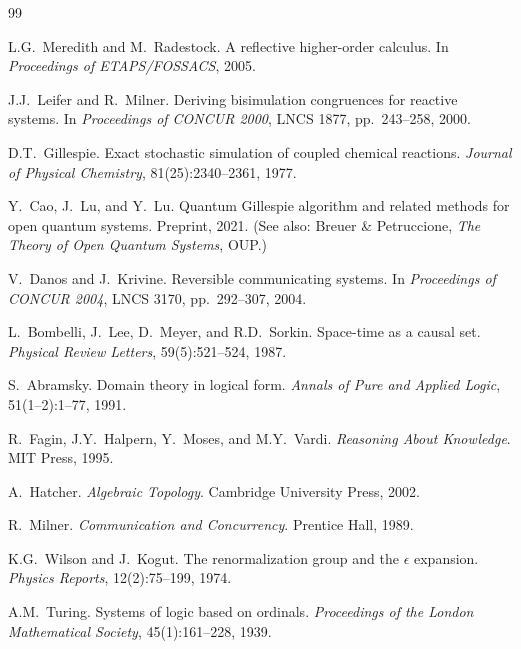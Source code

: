 \documentclass[12pt]{article}
\theoremstyle{remark}
\begin{document}
\begin{thebibliography}{99}

L.G.~Meredith and M.~Radestock.
\newblock A reflective higher-order calculus.
\newblock In \emph{Proceedings of ETAPS/FOSSACS}, 2005.

J.J.~Leifer and R.~Milner.
\newblock Deriving bisimulation congruences for reactive systems.
\newblock In \emph{Proceedings of CONCUR 2000}, LNCS 1877,
pp.~243--258, 2000.

D.T.~Gillespie.
\newblock Exact stochastic simulation of coupled chemical reactions.
\newblock \emph{Journal of Physical Chemistry}, 81(25):2340--2361, 1977.

Y.~Cao, J.~Lu, and Y.~Lu.
\newblock Quantum Gillespie algorithm and related methods for
open quantum systems.
\newblock Preprint, 2021.
\newblock (See also: Breuer \& Petruccione, \emph{The Theory of
Open Quantum Systems}, OUP.)

V.~Danos and J.~Krivine.
\newblock Reversible communicating systems.
\newblock In \emph{Proceedings of CONCUR 2004}, LNCS 3170,
pp.~292--307, 2004.

L.~Bombelli, J.~Lee, D.~Meyer, and R.D.~Sorkin.
\newblock Space-time as a causal set.
\newblock \emph{Physical Review Letters}, 59(5):521--524, 1987.

S.~Abramsky.
\newblock Domain theory in logical form.
\newblock \emph{Annals of Pure and Applied Logic},
51(1--2):1--77, 1991.

R.~Fagin, J.Y.~Halpern, Y.~Moses, and M.Y.~Vardi.
\newblock \emph{Reasoning About Knowledge}.
\newblock MIT Press, 1995.

A.~Hatcher.
\newblock \emph{Algebraic Topology}.
\newblock Cambridge University Press, 2002.

R.~Milner.
\newblock \emph{Communication and Concurrency}.
\newblock Prentice Hall, 1989.

K.G.~Wilson and J.~Kogut.
\newblock The renormalization group and the $\epsilon$ expansion.
\newblock \emph{Physics Reports}, 12(2):75--199, 1974.

A.M.~Turing.
\newblock Systems of logic based on ordinals.
\newblock \emph{Proceedings of the London Mathematical Society},
45(1):161--228, 1939.


\end{thebibliography}
\end{document}
